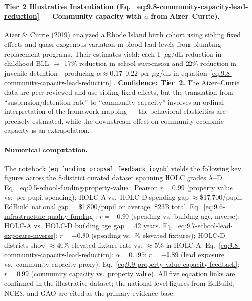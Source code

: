 \paragraph{Tier~2 Illustrative Instantiation (Eq.~\ref{eq:9.8-community-capacity-lead-reduction} --- Community capacity with $\alpha$ from Aizer--Currie).}
Aizer \& Currie (2019) analyzed a Rhode Island birth cohort using sibling fixed effects and quasi-exogenous variation in blood lead levels from plumbing replacement programs. Their estimates yield: each 1~$\mu$g/dL reduction in childhood BLL $\Rightarrow$ 17\% reduction in school suspension and 22\% reduction in juvenile detention---producing $\alpha \approx 0.17$--$0.22$ per $\mu$g/dL in equation~\ref{eq:9.8-community-capacity-lead-reduction} \cite{aizer_currie}. \textbf{Confidence: Tier~2.} The Aizer--Currie data are peer-reviewed and use sibling fixed effects, but the translation from ``suspension/detention rate'' to ``community capacity'' involves an ordinal interpretation of the framework mapping --- the behavioral elasticities are precisely estimated, while the downstream effect on community economic capacity is an extrapolation.

\paragraph{Numerical computation.}
The notebook (\texttt{eq\_funding\_propval\_feedback.ipynb}) yields the following key figures across the 8-district curated dataset spanning HOLC grades A--D. Eq.~\ref{eq:9.5-school-funding-property-value}: Pearson $r = 0.99$ (property value vs.\ per-pupil spending); HOLC-A vs.\ HOLC-D spending gap $\approx$\$17,700/pupil; EdBuild national gap = \$1,800/pupil on average, \$23B total. Eq.~\ref{eq:9.6-infrastructure-quality-funding}: $r = -0.90$ (spending vs.\ building age, inverse); HOLC-A vs.\ HOLC-D building age gap = 42 years. Eq.~\ref{eq:9.7-school-lead-exposure-inverse}: $r = -0.90$ (spending vs.\ \% elevated fixtures); HOLC-D districts show $\approx$40\% elevated fixture rate vs.\ $\approx$5\% in HOLC-A. Eq.~\ref{eq:9.8-community-capacity-lead-reduction}: $\alpha = 0.195$; $r = -0.89$ (lead exposure vs.\ community capacity proxy). Eq.~\ref{eq:9.9-property-value-capacity-feedback}: $r = 0.99$ (community capacity vs.\ property value). All five equation links are confirmed in the illustrative dataset; the national-level figures from EdBuild, NCES, and GAO are cited as the primary evidence base.

